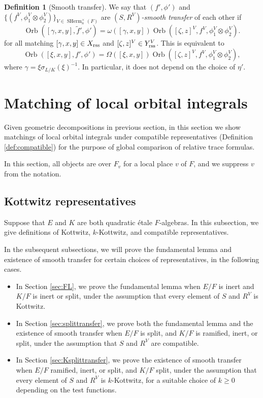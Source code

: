 \documentclass[11pt, reqno]{amsart}
\numberwithin{equation}{subsection}
\theoremstyle{plain}
\theoremstyle{definition}
\newtheorem{definition}[proposition]{Definition}
\DeclareMathOperator{\Orb}{Orb}
\DeclareMathOperator{\SHerm}{SHerm}
\newcommand{\rss}{\textnormal{rss}}
\begin{document}
\begin{definition}[Smooth transfer] \label{defn: smooth transfer}
We say that $(f', \phi')$ and $\{(f^V, \phi_1^V \otimes 
\phi_2^V)\}_{V \in \SHerm_n^\times(F)}$ are
\emph{$(S, R^V)$-smooth transfer} of each other if 
\[
    \Orb([\gamma, x, y], \widetilde f', \phi')
    = \omega([\gamma, x, y])
    \Orb([\zeta, z]^V, f^V, \phi_1^V\otimes \phi_2^V).
\]
for all matching $[\gamma, x, y] \in X_\rss$
and $[\zeta, z]^V \in Y_\rss^V$.
This is equivalent to
\[
    \Orb([\xi, x, y], f', \phi')
    = \Omega([\xi, x, y])
    \Orb([\zeta, z]^V, f^V, \phi_1^V\otimes \phi_2^V),
\]
where $\gamma = \xi\sigma_{L/K}(\xi)^{-1}$. 
In particular, it does not depend on the choice of
$\eta'$.
\end{definition}



\section{Matching of local orbital integrals} \label{section: matching orbits and integrals}

Given geometric decompositions in previous section, in this section we show matchings of local orbital integrals under compatible representatives (Definition \ref{def:compatible}) for the purpose of global comparison of relative trace formulas.


In this section, all objects are over $F_v$ for a local place $v$ of $F$, and we suppress $v$ from the notation. 




\subsection{Kottwitz representatives}
Suppose that $E$ and $K$
are both quadratic \'etale $F$-algebras. 
In this subsection, we give definitions of Kottwitz,
$k$-Kottwitz, and compatible representatives.

In the subsequent subsections, we will prove the
fundamental lemma and existence of smooth
transfer for certain choices of representatives,
in the following cases.

\begin{itemize}
    \item In Section \ref{sec:FL}, we prove the 
    fundamental lemma when $E/F$ is inert 
    and $K/F$ is inert or split, under the assumption
    that every element of $S$ and $R^V$ is
    Kottwitz.

    \item In Section \ref{sec:splittransfer},
    we prove both the fundamental lemma and the
    existence of smooth transfer when $E/F$
    is split, and $K/F$ is ramified, inert, or split,
    under the assumption that $S$ and $R^V$
    are compatible.
    
    \item In Section \ref{sec:Ksplittransfer},
    we prove the existence of smooth transfer  
    when $E/F$ ramified, inert, or split, 
    and $K/F$ split, under the assumption
    that every element of $S$ and $R^V$ is
    $k$-Kottwitz, for a suitable choice of $k \ge 0$
    depending on the test functions.
\end{itemize}
\end{document}
